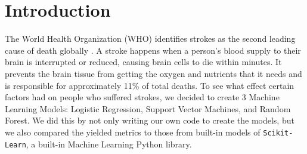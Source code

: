 \section{Introduction}
\label{sec:introduction}

The World Health Organization (WHO) identifies strokes as the second leading cause of death globally \cite{WHO}. A stroke happens when a person's blood supply to their brain is interrupted or reduced, causing brain cells to die within minutes. It prevents the brain tissue from getting the oxygen and nutrients that it needs and is responsible for approximately 11\% of total deaths. To see what effect certain factors had on people who suffered strokes, we decided to create 3 Machine Learning Models: Logistic Regression, Support Vector Machines, and Random Forest. We did this by not only writing our own code to create the models, but we also compared the yielded metrics to those from built-in models of \verb|Scikit-Learn|, a built-in Machine Learning Python library.
